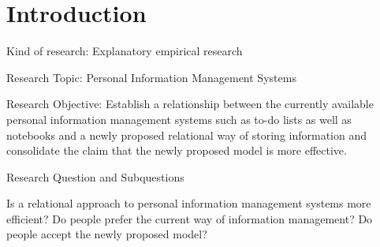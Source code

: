 \section{Introduction}

Kind of research: Explanatory empirical research

Research Topic: Personal Information Management Systems

Research Objective: Establish a relationship between the currently available personal information management systems such as to-do lists as well as notebooks and a newly proposed relational way of storing information and consolidate the claim that the newly proposed model is more effective.

Research Question and Subquestions

Is a relational approach to personal information management systems more efficient?
Do people prefer the current way of information management?
Do people accept the newly proposed model?
